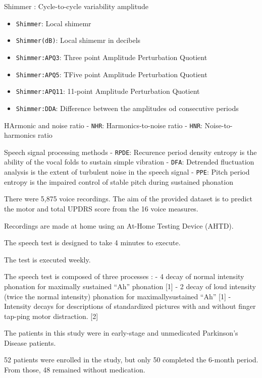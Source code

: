 \documentclass[11pt]{article}
\providecommand{\tightlist}{%
      \setlength{\itemsep}{0pt}\setlength{\parskip}{0pt}}
\begin{document}
Shimmer : Cycle-to-cycle variability amplitude

\begin{itemize}
\tightlist
\item
  \texttt{Shimmer}: Local shimemr
\item
  \texttt{Shimmer(dB)}: Local shimemr in decibels
\item
  \texttt{Shimmer:APQ3}: Three point Amplitude Perturbation Quotient
\item
  \texttt{Shimmer:APQ5}: TFive point Amplitude Perturbation Quotient
\item
  \texttt{Shimmer:APQ11}: 11-point Amplitude Perturbation Quotient
\item
  \texttt{Shimmer:DDA}: Difference between the amplitudes od consecutive
  periods
\end{itemize}

HArmonic and noise ratio - \texttt{NHR}: Harmonics-to-noise ratio -
\texttt{HNR}: Noise-to-harmonics ratio

Speech signal processing methods - \texttt{RPDE}: Recurence period
density entropy is the ability of the vocal folds to sustain simple
vibration - \texttt{DFA}: Detrended fluctuation analysis is the extent
of turbulent noise in the speech signal - \texttt{PPE}: Pitch period
entropy is the impaired control of stable pitch during sustained
phonation

    There were 5,875 voice recordings. The aim of the provided dataset is to
predict the motor and total UPDRS score from the 16 voice measures.

Recordings are made at home using an At-Home Testing Device (AHTD).

The speech test is designed to take 4 minutes to execute.

The test is executed weekly.

The speech test is composed of three processes : - 4 decay of normal
intensity phonation for maximally sustained ``Ah'' phonation {[}1{]} - 2
decay of loud intensity (twice the normal intensity) phonation for
maximallysustained ``Ah'' {[}1{]} - Intensity decays for descriptions of
standardized pictures with and without ﬁnger tap-ping motor distraction.
{[}2{]}

The patients in this study were in early-stage and unmedicated
Parkinson's Disease patients.

52 patients were enrolled in the study, but only 50 completed the
6-month period. From those, 48 remained without medication.
\end{document}
